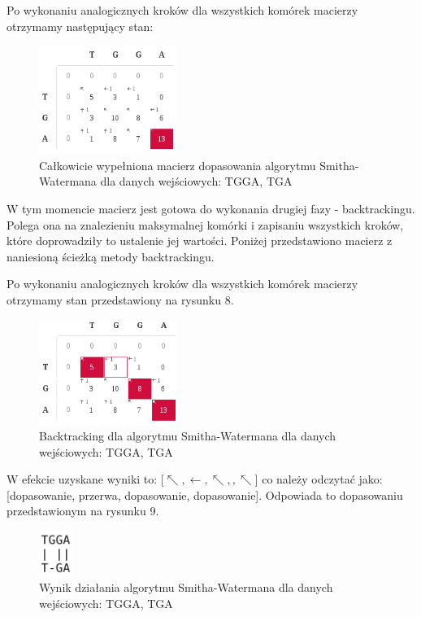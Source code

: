 \documentclass[a4paper,12pt]{article}
\begin{document}
Po wykonaniu analogicznych kroków dla wszystkich komórek macierzy otrzymamy następujący stan:
\begin{figure}[H]
  \vspace{5pt}
  \centering
  \begin{center}
  \includegraphics[width=0.4\textwidth]{images/SchematDzialaniaAlgorytmuPelnaMacierz.png}
  \end{center}
  \caption{Całkowicie wypełniona macierz dopasowania algorytmu Smitha-Watermana dla danych wejściowych: TGGA, TGA}
 \end{figure}


W tym momencie macierz jest gotowa do wykonania drugiej fazy - backtrackingu. Polega ona na znalezieniu maksymalnej komórki i zapisaniu wszystkich kroków, które doprowadziły to ustalenie jej wartości. Poniżej przedstawiono macierz z naniesioną ścieżką metody backtrackingu. 

Po wykonaniu analogicznych kroków dla wszystkich komórek macierzy otrzymamy stan przedstawiony na rysunku 8.
\begin{figure}[H]
  \vspace{5pt}
  \centering
  \begin{center}
  \includegraphics[width=0.4\textwidth]{images/SchematDzialaniaAlgorytmuPelnaMacierzBacktracking.png}
  \end{center}
  \caption{Backtracking dla algorytmu Smitha-Watermana dla danych wejściowych: TGGA, TGA}
 \end{figure}

W efekcie uzyskane wyniki to: [$\nwarrow, \leftarrow, \nwarrow, , \nwarrow$] co należy odczytać jako: [dopasowanie, przerwa, dopasowanie, dopasowanie]. 
Odpowiada to dopasowaniu przedstawionym na rysunku 9. 
\begin{figure}[H]
  \vspace{5pt}
  \centering
  \begin{center}
  \includegraphics[width=0.1\textwidth]{images/uzyskaneDopasowanie.png}
  \end{center}
  \caption{Wynik działania algorytmu Smitha-Watermana dla danych wejściowych: TGGA, TGA}
 \end{figure}
\end{document}
